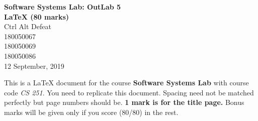 \documentclass[12pt]{article}
\begin{document}
\begin{titlepage}
\begin{center}
\vspace*{72mm}
\textbf{\Huge{Software Systems Lab: OutLab 5}}\\[3mm]
\textbf{\Huge{\LaTeX{ }(80 marks)}}\\[1cm]
\LARGE{Ctrl Alt Defeat}\\[5mm]
\normalsize{180050067}\\[1mm]
\normalsize{180050069}\\[1mm]
\normalsize{180050086}\\[1cm]
\large{12 September, 2019}
\end{center}
\end{titlepage}
\tableofcontents
{}
\newpage
This is a \LaTeX{} document for the course \textbf{Software Systems Lab} with course code \textit{CS 251}. You need to replicate this document. Spacing need not be matched perfectly but page numbers should be. \textbf{1 mark is for the title page.} Bonus marks will be given only if you score (80/80) in the rest. 
\end{document}
